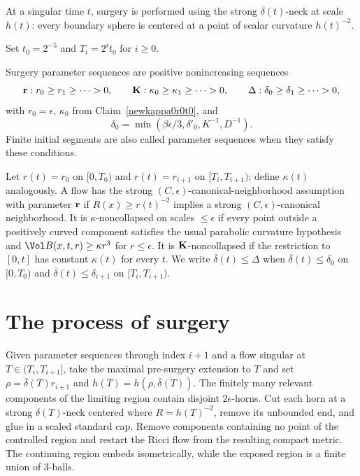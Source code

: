 At a singular time $t$, surgery is performed using the strong
$\overline\delta(t)$-neck at scale $h(t)$: every boundary sphere is centered at a
point of scalar curvature $h(t)^{-2}$.

\begin{definition}[Time steps $T_i=2^it_0$]
\label{def:time-steps-T-i}
Set $t_0=2^{-5}$ and $T_i=2^it_0$ for $i\geq0$.
\end{definition}

\begin{definition}
\label{def:surgery-parameter-sequences}
\label{surgeryparams}
Surgery parameter sequences are positive nonincreasing sequences
\[
  {\bf r}:r_0\geq r_1\geq\cdots>0,
  \qquad
  {\bf K}:\kappa_0\geq\kappa_1\geq\cdots>0,
  \qquad
  \Delta:\delta_0\geq\delta_1\geq\cdots>0,
\]
with $r_0=\epsilon$, $\kappa_0$ from Claim~\ref{newkappa0r0t0}, and
\[
  \delta_0=\min(\beta\epsilon/3,\delta'_0,K^{-1},D^{-1}).
\]
Finite initial segments are also called parameter sequences when they satisfy
these conditions.
\end{definition}

Let $r(t)=r_0$ on $[0,T_0)$ and $r(t)=r_{i+1}$ on
$[T_i,T_{i+1})$; define $\kappa(t)$ analogously. A flow has the strong
$(C,\epsilon)$-canonical-neighborhood assumption with parameter ${\bf r}$ if
$R(x)\geq r(t)^{-2}$ implies a strong $(C,\epsilon)$-canonical neighborhood.
It is $\kappa$-noncollapsed on scales $\leq\epsilon$ if every point outside a
positively curved component satisfies the usual parabolic curvature hypothesis
and $\Vol B(x,t,r)\geq\kappa r^3$ for $r\leq\epsilon$. It is ${\bf K}$-noncollapsed
if the restriction to $[0,t]$ has constant $\kappa(t)$ for every $t$. We write
$\overline\delta(t)\leq\Delta$ when
$\overline\delta(t)\leq\delta_0$ on $[0,T_0)$ and
$\overline\delta(t)\leq\delta_{i+1}$ on $[T_i,T_{i+1})$.

\section{The process of surgery}
\label{sect:process}

Given parameter sequences through index $i+1$ and a flow singular at
$T\in(T_i,T_{i+1}]$, take the maximal pre-surgery extension to $T$ and set
$\rho=\overline\delta(T)r_{i+1}$ and
$h(T)=h(\rho,\overline\delta(T))$. The finitely many relevant components of
the limiting region contain disjoint $2\epsilon$-horns. Cut each horn at a
strong $\delta(T)$-neck centered where $R=h(T)^{-2}$, remove its unbounded end,
and glue in a scaled standard cap. Remove components containing no point of
the controlled region and restart the Ricci flow from the resulting compact
metric. The continuing region embeds isometrically, while the exposed region is
a finite union of $3$-balls.

